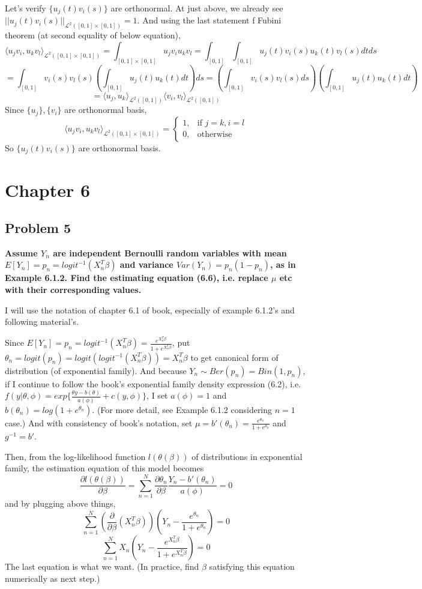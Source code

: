 \documentclass{article}
\begin{document}
Let's verify $\{u_j(t)v_i(s)\}$ are orthonormal. At just above, we already see $||u_j(t)v_i(s)||_{\mathcal{L}^2([0,1]\times[0,1])}=1$.
And using the last statement f Fubini theorem (at second equality of below equation),
\[\langle u_jv_i, u_kv_l \rangle_{\mathcal{L}^2([0,1]\times[0,1])} =\int_{[0,1]\times[0,1]} u_jv_iu_kv_l = \int_{[0,1]}\int_{[0,1]} u_j(t)v_i(s)u_k(t)v_l(s)dt ds\]
\[=\int_{[0,1]} v_i(s)v_l(s) (\int_{[0,1]} u_j(t)u_k(t) dt) ds=(\int_{[0,1]} v_i(s)v_l(s)ds) (\int_{[0,1]} u_j(t)u_k(t) dt) \]
\[= \langle u_j, u_k \rangle_{\mathcal{L}^2([0,1])} \langle v_i, v_l \rangle_{\mathcal{L}^2([0,1])}\]
Since $\{u_j\}, \{v_i\}$ are orthonormal basis, 
\[
    \langle u_jv_i, u_kv_l \rangle_{\mathcal{L}^2([0,1]\times[0,1])}=
\begin{cases}
    1, & \text{if } j=k,i=l \\ 
    0, & \text{otherwise}
\end{cases}
\]
So $\{u_j(t)v_i(s)\}$ are orthonormal basis.

\section{Chapter 6}
\subsection{Problem 5}
\textbf{
Assume $Y_n$ are independent Bernoulli random variables with mean $E[Y_n]=p_n=logit^{-1}(X_n^T\beta)$ and 
variance $Var(Y_n)=p_n(1-p_n)$, as in Example 6.1.2.
Find the estimating equation (6.6), i.e. replace $\mu$ etc with their corresponding values.
}

I will use the notation of chapter 6.1 of book, especially of example 6.1.2's and following material's.

Since $E[Y_n]=p_n=logit^{-1}(X_n^T\beta)=\frac{e^{X_n^T\beta}}{1+e^{X_n^T\beta}}$, 
put $\theta_n=logit(p_n)=logit(logit^{-1}(X_n^T\beta))=X_n^T\beta$ to get canonical form of distribution (of exponential family).
And because $Y_n\sim Ber(p_n) = Bin(1,p_n)$, if I continue to follow the book's exponential family density expression (6.2),
i.e. \(f(y|\theta,\phi)=exp\{\frac{\theta y - b(\theta)}{a(\phi)} + c(y,\phi)\}\), I set
$a(\phi)=1$ and $b(\theta_n)=log(1+e^{\theta_n})$.
(For more detail, see Example 6.1.2 considering $n=1$ case.)
And with consistency of book's notation, set $\mu=b'(\theta_n)=\frac{e^{\theta_n}}{1+e^{\theta_n}}$ and $g^{-1}=b'$.

Then, from the log-likelihood function $l(\theta(\beta))$ of distributions in exponential family, 
the estimation equation of this model becomes
\[\frac{\partial l(\theta(\beta))}{\partial\beta} = \sum_{n=1}^N \frac{\partial\theta_n}{\partial\beta} \frac{Y_n-b'(\theta_n)}{a(\phi)}=0\]
and by plugging above things,
\[\sum_{n=1}^N (\frac{\partial}{\partial\beta}(X_n^T\beta)) (Y_n-\frac{e^{\theta_n}}{1+e^{\theta_n}})=0\]
\[\sum_{n=1}^N X_n(Y_n-\frac{e^{X_n^T\beta}}{1+e^{X_n^T\beta}})=0\]
The last equation is what we want. (In practice, find $\beta$ satisfying this equation numerically as next step.)
\end{document}
